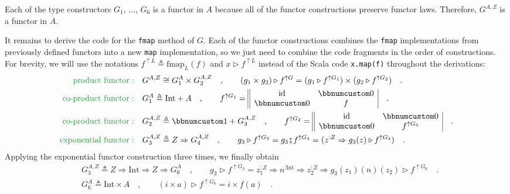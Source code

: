 Each of the type constructors $G_{1}$, ..., $G_{6}$ is a functor
in $A$ because all of the functor constructions preserve functor
laws. Therefore, $G^{A,Z}$ is a functor in $A$. 

It remains to derive the code for the \lstinline!fmap! method of
$G$. Each of the functor constructions combines the \lstinline!fmap!
implementations from previously defined functors into a new \lstinline!map!
implementation, so we just need to combine the code fragments in the
order of constructions. For brevity, we will use the notations $f^{\uparrow L}\triangleq\text{fmap}_{L}(f)$
and $x\triangleright f^{\uparrow L}$ instead of the Scala code \lstinline!x.map(f)!
throughout the derivations:
\begin{align*}
{\color{greenunder}\text{product functor}:}\quad & G^{A,Z}\cong G_{1}^{A}\times G_{2}^{A,Z}\quad,\quad\quad(g_{1}\times g_{2})\triangleright f^{\uparrow G}=(g_{1}\triangleright f^{\uparrow G_{1}})\times(g_{2}\triangleright f^{\uparrow G_{2}})\quad.\\
{\color{greenunder}\text{co-product functor}:}\quad & G_{1}^{A}\triangleq\text{Int}+A\quad,\quad\quad f^{\uparrow G_{1}}=\begin{array}{||cc|}
\text{id} & \bbnum 0\\
\bbnum 0 & f
\end{array}\quad.\\
{\color{greenunder}\text{co-product functor}:}\quad & G_{2}^{A,Z}\triangleq\bbnum 1+G_{3}^{A,Z}\quad,\quad\quad f^{\uparrow G_{2}}=\begin{array}{||cc|}
\text{id} & \bbnum 0\\
\bbnum 0 & f^{\uparrow G_{3}}
\end{array}\quad.\\
{\color{greenunder}\text{exponential functor}:}\quad & G_{3}^{A,Z}\triangleq Z\Rightarrow G_{4}^{A,Z}\quad,\quad\quad g_{3}\triangleright f^{\uparrow G_{3}}=g_{3}\bef f^{\uparrow G_{4}}=(z^{:Z}\Rightarrow g_{3}(z)\triangleright f^{\uparrow G_{4}})\quad.
\end{align*}
Applying the exponential functor construction three times, we finally
obtain
\begin{align*}
 & G_{3}^{A,Z}\triangleq Z\Rightarrow\text{Int}\Rightarrow Z\Rightarrow G_{6}^{A}\quad,\quad\quad g_{3}\triangleright f^{\uparrow G_{3}}=z_{1}^{:Z}\Rightarrow n^{:\text{Int}}\Rightarrow z_{2}^{:Z}\Rightarrow g_{3}(z_{1})(n)(z_{2})\triangleright f^{\uparrow G_{6}}\quad.\\
 & G_{6}^{A}\triangleq\text{Int}\times A\quad,\quad\quad(i\times a)\triangleright f^{\uparrow G_{6}}=i\times f(a)\quad.
\end{align*}
